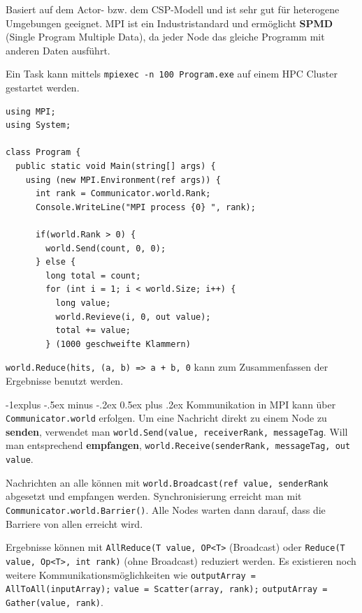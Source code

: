 \documentclass[a4paper, fontsize=6pt]{scrartcl}
\makeatletter
\renewcommand{\subsection}{\@startsection{subsection}{2}{0mm}%
    {-1explus -.5ex minus -.2ex}%
    {0.5ex plus .2ex}%
    {\normalfont\normalsize\bfseries}}
\makeatother
\begin{document}
\begin{multicols*}{5}
Basiert auf dem Actor- bzw. dem CSP-Modell und ist sehr gut für heterogene Umgebungen geeignet. MPI ist ein Industristandard und ermöglicht \textbf{SPMD} (Single Program Multiple Data), da jeder Node das gleiche Programm mit anderen Daten ausführt.

Ein Task kann mittels \texttt{mpiexec -n 100 Program.exe} auf einem HPC Cluster gestartet werden.

\begin{verbatim}
using MPI; 
using System;

class Program {
  public static void Main(string[] args) {
    using (new MPI.Environment(ref args)) {
      int rank = Communicator.world.Rank;
      Console.WriteLine("MPI process {0} ", rank);
      
      if(world.Rank > 0) {
        world.Send(count, 0, 0);
      } else {
        long total = count;
        for (int i = 1; i < world.Size; i++) {
          long value;
          world.Revieve(i, 0, out value);
          total += value;
        } (1000 geschweifte Klammern)
\end{verbatim}

\texttt{world.Reduce(hits, (a, b) => a + b, 0} kann zum Zusammenfassen der Ergebnisse benutzt werden.

\subsection{Kommunikation} in MPI kann über \texttt{Communicator.world} erfolgen. Um eine Nachricht direkt zu einem Node zu \textbf{senden}, verwendet man \texttt{world.Send(value, receiverRank, messageTag}. Will man entsprechend \textbf{empfangen}, \texttt{world.Receive(senderRank, messageTag, out value}.

Nachrichten an alle können mit \texttt{world.Broadcast(ref value, senderRank} abgesetzt und empfangen werden. Synchronisierung erreicht man mit \texttt{Communicator.world.Barrier()}. Alle Nodes warten dann darauf, dass die Barriere von allen erreicht wird.

Ergebnisse können mit \texttt{AllReduce(T value, OP<T>} (Broadcast) oder \texttt{Reduce(T value, Op<T>, int rank)} (ohne Broadcast) reduziert werden. Es existieren noch weitere Kommunikationsmöglichkeiten wie \texttt{outputArray = AllToAll(inputArray);} \texttt{value = Scatter(array, rank);} \texttt{outputArray = Gather(value, rank)}.


\end{multicols*}
\end{document}
